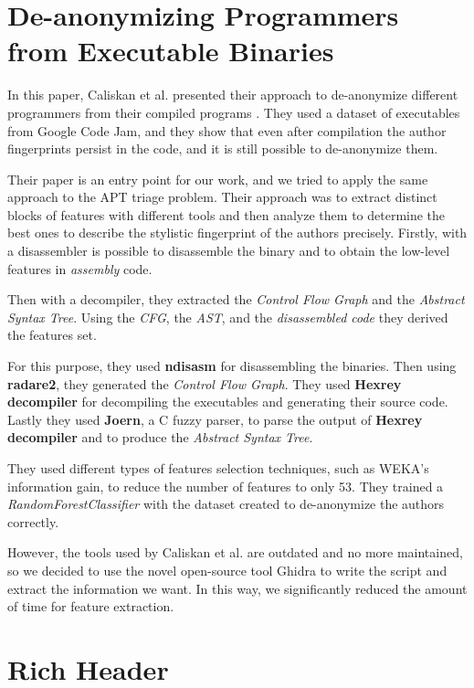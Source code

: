 \section{De-anonymizing Programmers from Executable Binaries}
In this paper, Caliskan et al. presented their approach to de-anonymize different programmers from their compiled programs \cite{caliskan2015anonymizing}. They used a dataset of executables from Google Code Jam, and they show that even after compilation the author fingerprints persist in the code, and it is still possible to de-anonymize them.

Their paper is an entry point for our work, and we tried to apply the same approach to the APT triage problem. Their approach was to extract distinct blocks of features with different tools and then analyze them to determine the best ones to describe the stylistic fingerprint of the authors precisely. Firstly,  with a disassembler is possible to disassemble the binary and to obtain the low-level features in \textit{assembly} code.

Then with a decompiler, they extracted the \textit{Control Flow Graph} and the \textit{Abstract Syntax Tree}. Using the \textit{CFG}, the \textit{AST}, and the \textit{disassembled code} they derived the features set.

For this purpose, they used \textbf{ndisasm} for disassembling the binaries. Then using \textbf{radare2}, they generated the \textit{Control Flow Graph}. They used \textbf{Hexrey decompiler} for decompiling the executables and generating their source code. Lastly they used \textbf{Joern}, a C fuzzy parser, to parse the output of \textbf{Hexrey decompiler} and to produce the \textit{Abstract Syntax Tree}.

They used different types of features selection techniques, such as WEKA's information gain, to reduce the number of features to only 53. They trained a \textit{RandomForestClassifier} with the dataset created to de-anonymize the authors correctly.

However, the tools used by Caliskan et al. are outdated and no more maintained, so we decided to use the novel open-source tool Ghidra to write the script and extract the information we want. In this way, we significantly reduced the amount of time for feature extraction.



\section{Rich Header}

